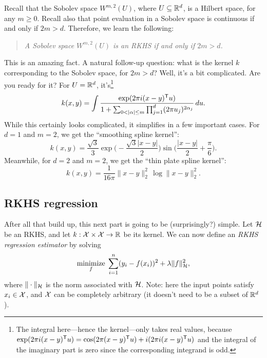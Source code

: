 \documentclass{article}
\begin{document}
Recall that the Sobolev space $W^{m,2}(U)$, where $U \subseteq \mathbb{R}^d$, is a
Hilbert space, for any $m \geq 0$. Recall also that point evaluation in a
Sobolev space is continuous if and only if $2m > d$. Therefore, we learn the
following:       
\begin{quote}
\centering\it
A Sobolev space $W^{m,2}(U)$ is an RKHS if and only if $2m > d$.
\end{quote}
This is an amazing fact. A natural follow-up question: what is the kernel $k$
corresponding to the Sobolev space, for $2m > d$? Well, it's a bit
complicated. Are you ready for it? For $U = \mathbb{R}^d$, it's\footnote{The integral 
  here---hence the kernel---only takes real values, because $\exp(2\pi i
  (x-y)^{\mathsf{T}} u) = \cos(2\pi(x-y)^{\mathsf{T}} u) + i (2\pi i (x-y)^{\mathsf{T}} u)$ and the integral
  of the imaginary part is zero since the corresponding integrand is odd.}  
\[
k(x,y) = \int \frac{\exp(2\pi i (x-y)^{\mathsf{T}} u)}{1 + \sum_{0 < |\alpha| \leq m}
  \prod_{j=1}^d (2\pi u_j)^{2\alpha_j}} \, du.
\]
While this certainly looks complicated, it simplifies in a few important cases.  
For $d=1$ and $m=2$, we get the ``smoothing spline kernel'': 
\begin{equation}
\label{eq:ss_rkhs}
k(x,y) = \frac{\sqrt{3}}{3} \exp\bigg( -\frac{\sqrt{3}|x-y|}{2} \bigg) 
\sin\bigg( \frac{|x-y|}{2} + \frac{\pi}{6} \bigg).
\end{equation}
Meanwhile, for $d=2$ and $m=2$, we get the ``thin plate spline kernel'': 
\begin{equation}
\label{eq:tp_rkhs}
k(x,y) = \frac{1}{16 \pi} \|x-y\|_2^2 \, \log \|x-y\|_2^2.
\end{equation}

\subsection{RKHS regression}

After all that build up, this next part is going to be (surprisingly?)
simple. Let $\mathcal{H}$ be an RKHS, and let $k : \mathcal{X} \times \mathcal{X} \to \mathbb{R}$ be its
kernel. We can now define an \emph{RKHS regression estimator} by solving 
\begin{equation}
\label{eq:rkhs}
\mathop{\mathrm{minimize}}_f \; \sum_{i=1}^n (y_i - f(x_i))^2 + \lambda \|f\|_{\mathcal{H}}^2,
\end{equation}
where $\|\cdot\|_{\mathcal{H}}$ is the norm associated with $\mathcal{H}$. Note: here the input
points satisfy $x_i \in \mathcal{X}$, and $\mathcal{X}$ can be completely arbitrary (it doesn't
need to be a subset of $\mathbb{R}^d$). 
\end{document}
